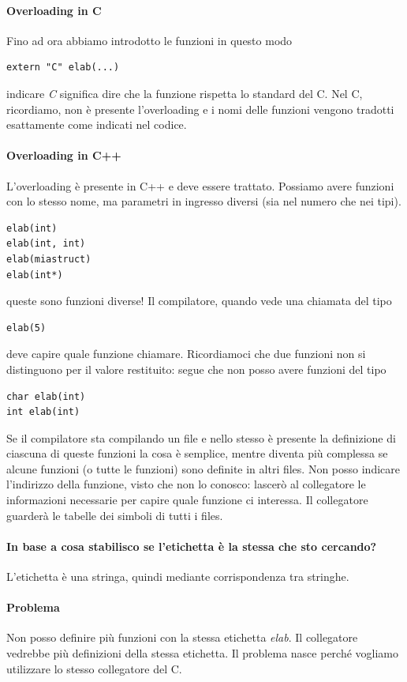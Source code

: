\documentclass[11pt]{report}
\theoremstyle{definition}
\begin{document}
\paragraph{Overloading in C} Fino ad ora abbiamo introdotto le funzioni in questo modo
\begin{verbatim}
extern "C" elab(...)
\end{verbatim}
indicare \emph{C} significa dire che la funzione rispetta lo standard del C. Nel C, ricordiamo, non è presente l'overloading e i nomi delle funzioni vengono tradotti esattamente come indicati nel codice.
\paragraph{Overloading in C++} L'overloading è presente in C++ e deve essere trattato. Possiamo avere funzioni con lo stesso nome, ma parametri in ingresso diversi (sia nel numero che nei tipi).
\begin{verbatim}
elab(int)
elab(int, int)
elab(miastruct)
elab(int*)
\end{verbatim}
queste sono funzioni diverse! Il compilatore, quando vede una chiamata del tipo
\begin{verbatim}
elab(5)
\end{verbatim}
deve capire quale funzione chiamare. Ricordiamoci che due funzioni non si distinguono per il valore restituito: segue che non posso avere funzioni del tipo
\begin{verbatim}
char elab(int)
int elab(int)
\end{verbatim}
Se il compilatore sta compilando un file e nello stesso è presente la definizione di ciascuna di queste funzioni la cosa è semplice, mentre diventa più complessa se alcune funzioni (o tutte le funzioni) sono definite in altri files. Non posso indicare l'indirizzo della funzione, visto che non lo conosco: lascerò al collegatore le informazioni necessarie per capire quale funzione ci interessa. Il collegatore guarderà le tabelle dei simboli di tutti i files. 
\paragraph{In base a cosa stabilisco se l'etichetta è la stessa che sto cercando?} L'etichetta è una stringa, quindi mediante corrispondenza tra stringhe. 
\paragraph{Problema} Non posso definire più funzioni con la stessa etichetta \emph{elab}. Il collegatore vedrebbe più definizioni della stessa etichetta. Il problema nasce perché vogliamo utilizzare lo stesso collegatore del C.
\end{document}
